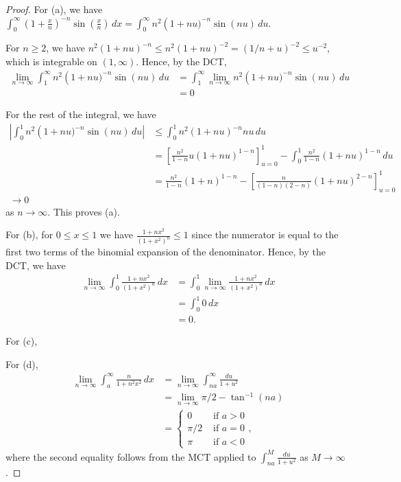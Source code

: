 \documentclass{article}
\begin{document}
\begin{proof}
For (a), we have  $\int_0^\infty \left( 1 + \frac x n \right)^{-n} \sin \left(\frac x n \right) \, dx  = \int_0^\infty n^2 \left( 1 + n u)^{-n} \sin(nu) \, du$.

For $n \ge 2$, we have $n^2 (1 + nu)^{-n} \le n^2 (1 + nu)^{-2} = (1/n + u)^{-2}  \le u^{-2}$, which is integrable on $(1, \infty)$.  Hence, by the DCT, 
\begin{align*}
 \lim_{n\to \infty} \int_1^\infty n^2 \left( 1 + n u)^{-n} \sin(nu) \, du  & = \int_1^\infty \lim_{n\to \infty} n^2 \left( 1 + n u)^{-n} \sin(nu) \, du
\\ & = 0
\end{align*}

For the rest of the integral, we have
\begin{align*}
\left| \int_0^1 n^2 \left( 1 + n u)^{-n} \sin(nu) \, du \right| & \le \int_0^1 n^2 \left(1 + nu \right)^{-n} nu \, du 
\\ & = \left[ \frac{n^2}{1 - n} u (1+nu)^{1-n} \right]_{u=0}^1 - \int_0^1 \frac{n^2}{1-n} (1+nu)^{1-n} \, du
\\ & = \frac{n^2}{1-n} (1+n)^{1-n} - \left[ \frac{n}{(1-n)(2-n)} (1+nu)^{2-n} \right]_{u=0}^1
\\ \to 0
\end{align*}
as $n \to \infty$.  This proves (a).

For (b), for $0 \le x \le 1$ we have $\frac{1 + n x^2} {(1 + x^2)^n} \le 1$ since the numerator is equal to the first two terms of the binomial expansion of the denominator. Hence, by the DCT, we have
\begin{align*}
\lim_{n \to \infty} \int_0^1 \frac{1 + n x^2} {(1 + x^2)^n} \, dx & = \int_0^1 \lim_{n \to \infty} \frac{1 + n x^2} {(1 + x^2)^n} \, dx 
\\ & = \int_0^1 0 \,dx
\\ & = 0.
\end{align*}

For (c),


For (d),
\begin{align*}
\lim_{n \to \infty} \int_a^\infty \frac n {1 + n^2 x^2} \, dx  & = \lim_{n \to \infty} \int_{na}^\infty \frac {du} {1 + u^2} 
\\ & = \lim_{n \to \infty} \pi/2 - \tan^{-1}(na)
\\ & = \left\{ 
\begin{array}{ll}
   0 & \text{ if } a > 0
\\ \pi/2 & \text{ if } a = 0
\\ \pi  & \text{ if } a < 0
\end{array} \right.,
\end{align*}
where the second equality follows from the MCT applied to $\int_{na}^M \frac {du} {1+u^2}$ as $M \to \infty$.



\end{proof}
\end{document}
